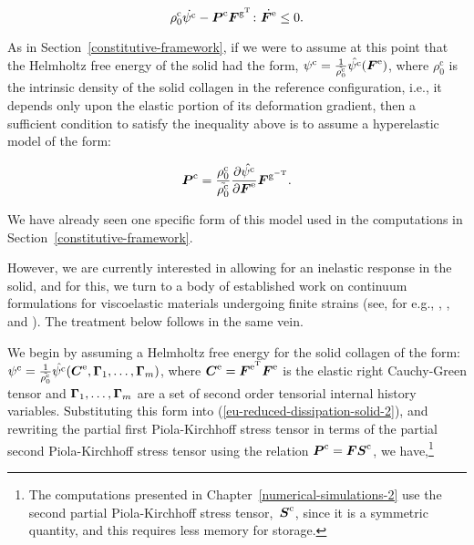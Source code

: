 \begin{equation}
\rho_{0}^{\mathrm{c}} \dot{\psi^{\mathrm{c}}} - \mbox{\boldmath$ P$}^{\mathrm{c}}
\mbox{\boldmath$ F$}^{\mathrm{g}^{\mathrm{T}}} \colon \dot{\mbox{\boldmath$ F$}^{\mathrm{e}}} \leq 0.
\label{eu-reduced-dissipation-solid-2}
\end{equation}

As in Section~\ref{constitutive-framework}, if we were to assume at
this point that the Helmholtz free energy of the solid had the form,
$\psi^{\mathrm{c}} = \frac{1}{\tilde{\rho_{0}^{\mathrm{c}}}}
\hat{\psi^{\mathrm{c}}} (\mbox{\boldmath$ F$}^{\mathrm{e}})$, where
$\rho_{0}^{\mathrm{c}}$ is the intrinsic density of the solid collagen
in the reference configuration, i.e., it depends only upon the elastic
portion of its deformation gradient, then a sufficient condition to
satisfy the inequality above is to assume a hyperelastic model of the
form:

\begin{equation}
\mbox{\boldmath$ P$}^{\mathrm{c}} =
\frac{\rho_{0}^{\mathrm{c}}}{\tilde{\rho_{0}^{\mathrm{c}}}}
\frac{\partial \hat{\psi^{\mathrm{c}}}}{\partial \mbox{\boldmath$ F$}^{\mathrm{e}}}
\mbox{\boldmath$ F$}^{\mathrm{g}^{\mathrm{-T}}}.
\label{eu-solid-hyperelastic}
\end{equation}

\noindent We have already seen one specific form of this model used in
the computations in Section~\ref{constitutive-framework}.

However, we are currently interested in allowing for an inelastic
response in the solid, and for this, we turn to a body of established
work on continuum formulations for viscoelastic materials undergoing
finite strains (see, for e.g., \citet{simo86}, \citet{holzapfel96},
and \citet{SimoHughes:98}). The treatment below follows in the same
vein.

We begin by assuming a Helmholtz free energy for the solid collagen of
the form: $\psi^{\mathrm{c}} = \frac{1}{\tilde{\rho_{0}^{\mathrm{c}}}}
\hat{\psi^{\mathrm{c}}} (\mbox{\boldmath$ C$}^{\mathrm{e}}, \mbox{\boldmath$\Gamma$}_{1}, \ldots,
\mbox{\boldmath$\Gamma$}_{m})$, where $\mbox{\boldmath$ C$}^{\mathrm{e}}= \mbox{\boldmath$ F$}^{\mathrm{e}^{\mathrm{T}}}
\mbox{\boldmath$ F$}^{\mathrm{e}}$ is the elastic right Cauchy-Green tensor and
$\mbox{\boldmath$\Gamma$}_{1}, \ldots, \mbox{\boldmath$\Gamma$}_{m}$ are a set of second order tensorial
internal history variables. Substituting this form into
(\ref{eu-reduced-dissipation-solid-2}), and rewriting the partial
first Piola-Kirchhoff stress tensor in terms of the partial second
Piola-Kirchhoff stress tensor using the relation $\mbox{\boldmath$ P$}^{\mathrm{c}} =
\mbox{\boldmath$ F$} \mbox{\boldmath$ S$}^{\mathrm{c}}$, we have,\footnote{The computations presented in
  Chapter~\ref{numerical-simulations-2} use the second partial
  Piola-Kirchhoff stress tensor,~$\mbox{\boldmath$ S$}^{\mathrm{c}}$, since it is a
  symmetric quantity, and this requires less memory for storage.}

